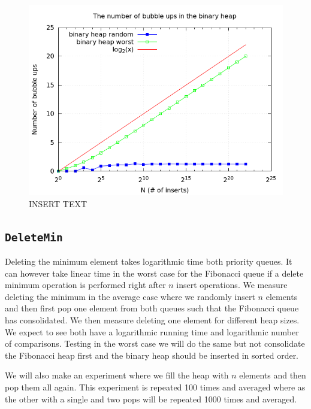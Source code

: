 \documentclass[a4paper,oneside,article,11pt]{memoir}
\begin{document}
\begin{figure}[H]
\centering
  \includegraphics[scale=0.5]{../res/inserts/insert_bubble_up.png}%
  \caption{INSERT TEXT}
  \label{fig:bubble_ups}
\end{figure}

\subsection{\texttt{DeleteMin}}
Deleting the minimum element takes logarithmic time both priority queues. It can however take linear time in the worst case for the Fibonacci queue if a delete minimum operation is performed right after $n$ insert operations. We measure deleting the minimum in the average case where we randomly insert $n$ elements and then first pop one element from both queues such that the Fibonacci queue has consolidated. We then measure deleting one element for different heap sizes. We expect to see both have a logarithmic running time and logarithmic number of comparisons.
Testing in the worst case we will do the same but not consolidate the Fibonacci heap first and the binary heap should be inserted in sorted order.

We will also make an experiment where we fill the heap with $n$ elements and then pop them all again. This experiment is repeated 100 times and averaged where as the other with a single and two pops will be repeated 1000 times and averaged.
\end{document}
